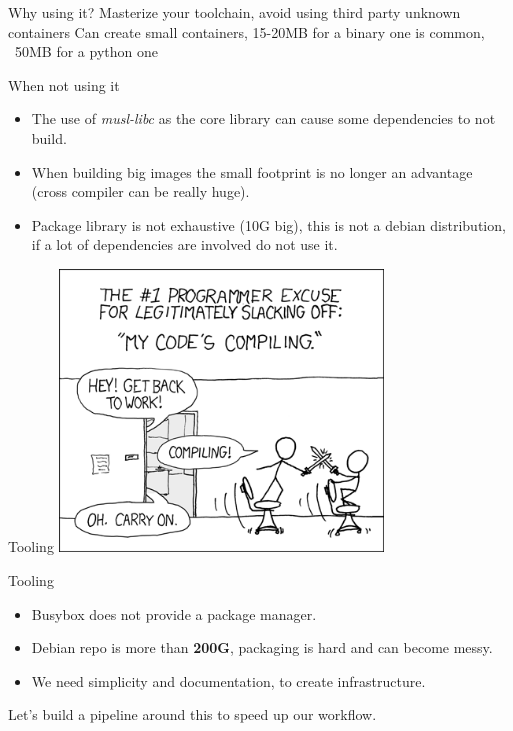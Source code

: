\documentclass{beamer}
\begin{document}
\begin{frame}{Why using it?}
    Masterize your toolchain, avoid using third party unknown containers
  Can create small containers, 15-20MB for a binary one is common,
    ~50MB for a python one
\end{frame}

\begin{frame}{When not using it}
  \begin{itemize}
    \item The use of \textit{musl-libc} as the core library can cause some
      dependencies to not build.
    \item When building big images the small footprint is no longer an advantage
      (cross compiler can be really huge).
    \item Package library is not exhaustive (10G big),
      this is not a debian distribution,
      if a lot of dependencies are involved do not use it.
  \end{itemize}
\end{frame}

\begin{frame}{Tooling}
  \includegraphics[height=75mm]{compiling}
  \centering
\end{frame}

\begin{frame}{Tooling}{}
  \begin{itemize}
    \item Busybox does not provide a package manager.
    \item Debian repo is more than \textbf{200G}, packaging is hard and can become messy.
    \item We need simplicity and documentation, to create infrastructure.
  \end{itemize}
  Let's build a pipeline around this to speed up our workflow.
\end{frame}
\end{document}
